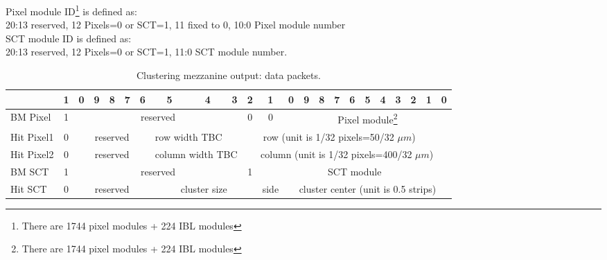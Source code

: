 \documentclass[10pt]{article}
\numberwithin{figure}{section}
\numberwithin{equation}{section}
\numberwithin{table}{section}
\newcommand{\0}{\phantom{0}}
\begin{document}
Pixel module ID\footnote{There are 1744 pixel modules + 224 IBL modules} is defined as: \\
20:13 reserved, 12 Pixels=0 or SCT=1, 11 fixed to 0, 10:0 Pixel module number \\
SCT module ID is defined as: \\
20:13 reserved, 12 Pixels=0 or SCT=1, 11:0 SCT module number.
\begin{table}[h]
\begin{tabular}{l|c|c|c|c|c|c|c|c|c|c|c|c|c|c|c|c|c|c|c|c|c|c|}
& 1 & 0 &  9 & 8 & 7 & 6 & 5 & 4 & 3 & 2 & 1 & 0 & 9 & 8 & 7 & 6 & 5 & 4 & 3 & 2 & 1 & 0 \\ \hline
BM Pixel & 1 & \multicolumn{8}{c|}{reserved} & 0 & 0 &
               \multicolumn{11}{c|}{Pixel module\footnote{There are 1744 pixel modules + 224 IBL modules} } \\\hline
Hit Pixel1 & 0 & \multicolumn{5}{c|}{reserved} & \multicolumn{2}{c|}{row width TBC} &
                   \multicolumn{14}{c|}{row (unit is 1/32 pixels=50/32 $\mu m$) } \\\hline
Hit Pixel2 & 0 & \multicolumn{5}{c|}{reserved} & \multicolumn{3}{c|}{column width TBC} &
                   \multicolumn{13}{c|}{column (unit is 1/32 pixels=400/32 $\mu m$) } \\\hline
BM SCT &1 & \multicolumn{8}{c|}{reserved} & 1 &
               \multicolumn{12}{c|}{SCT module} \\\hline
Hit SCT & 0 & \multicolumn{5}{c|}{reserved} & \multicolumn{4}{c|}{cluster size} &
                 \multicolumn{1}{c|}{side} &
                 \multicolumn{11}{c|}{ cluster center (unit is 0.5 strips)} \\\hline
\end{tabular}
\caption{\label{tab:FTK_IM_OUT_data}Clustering mezzanine output: data packets.}
\end{table}
\end{document}
